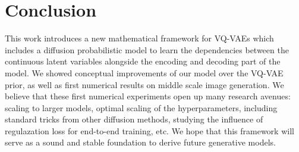 \documentclass[nohyperref]{article}
\theoremstyle{plain}
\theoremstyle{definition}
\theoremstyle{remark}
\begin{document}
\section{Conclusion}
This work introduces a new mathematical framework for VQ-VAEs which includes a diffusion probabilistic model to learn the dependencies between the continuous latent  variables alongside the encoding and decoding part of the model. We showed conceptual improvements of our model over the VQ-VAE prior, as well as first numerical results on middle scale image generation. We believe that these first numerical experiments open up many research avenues: scaling to larger models, optimal scaling of the hyperparameters, including standard tricks from other diffusion methods, studying the influence of regulazation loss for end-to-end training, etc. We hope that this framework will serve as a sound and stable foundation to derive future generative models.

\end{document}

